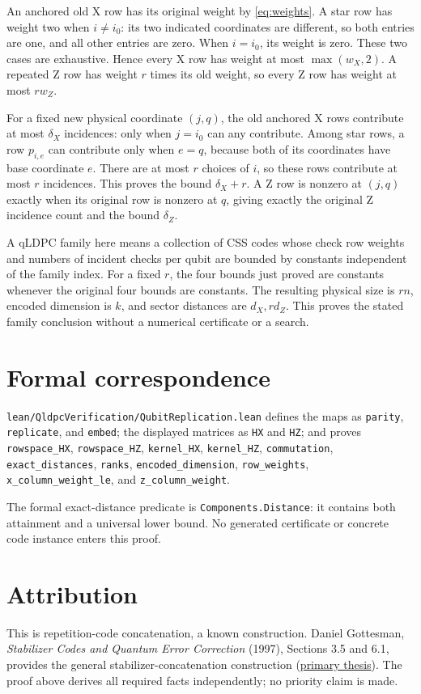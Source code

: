 \documentclass{article}
\begin{document}
An anchored old X row has its original weight by \eqref{eq:weights}. A star row has
weight two when \(i\ne i_0\): its two indicated coordinates are
different, so both entries are one, and all other entries are zero.
When \(i=i_0\), its weight is zero. These two cases are exhaustive.
Hence every X row has weight at most \(\max(w_X,2)\). A repeated Z row
has weight \(r\) times its old weight, so every Z row has weight at most
\(r w_Z\).

For a fixed new physical coordinate \((j,q)\), the old anchored X rows
contribute at most \(\delta_X\) incidences: only when \(j=i_0\) can any
contribute. Among star rows, a row \(p_{i,e}\) can contribute only when
\(e=q\), because both of its coordinates have base coordinate \(e\).
There are at most \(r\) choices of \(i\), so these rows contribute at
most \(r\) incidences. This proves the bound \(\delta_X+r\). A Z row is
nonzero at \((j,q)\) exactly when its original row is nonzero at \(q\),
giving exactly the original Z incidence count and the bound
\(\delta_Z\).

A qLDPC family here means a collection of CSS codes whose check row
weights and numbers of incident checks per qubit are bounded by
constants independent of the family index. For a fixed \(r\), the four
bounds just proved are constants whenever the original four bounds
are constants. The resulting physical size is \(rn\), encoded dimension
is \(k\), and sector distances are \(d_X,r d_Z\). This proves the stated
family conclusion without a numerical certificate or a search.

\section{Formal correspondence}\label{sec:formal}

\begin{sloppypar}
\texttt{lean/QldpcVerification/QubitReplication.lean} defines the maps as
\texttt{parity}, \texttt{replicate}, and \texttt{embed}; the displayed matrices as
\texttt{HX} and \texttt{HZ};
and proves \texttt{rowspace\_HX}, \texttt{rowspace\_HZ}, \texttt{kernel\_HX},
\texttt{kernel\_HZ}, \texttt{commutation}, \texttt{exact\_distances},
\texttt{ranks}, \texttt{encoded\_dimension}, \texttt{row\_weights},
\texttt{x\_column\_weight\_le}, and \texttt{z\_column\_weight}.
\end{sloppypar}

The formal exact-distance predicate is \texttt{Components.Distance}: it contains
both attainment and a universal lower bound. No generated certificate
or concrete code instance enters this proof.

\section{Attribution}\label{sec:attribution}

This is repetition-code concatenation, a known construction. Daniel Gottesman,
\emph{Stabilizer Codes and Quantum Error Correction} (1997), Sections 3.5 and 6.1,
provides the general stabilizer-concatenation construction
(\href{https://thesis.caltech.edu/2900/02/THESIS.pdf}{primary thesis}).
The proof above derives all required facts independently; no priority claim is made.
\end{document}
